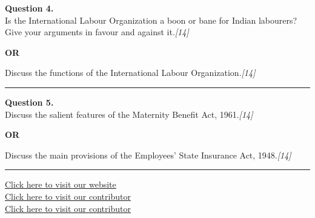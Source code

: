 \documentclass[11pt,a4paper]{article}
\newcommand{\pts}[1]{\hfill   \textit{[#1]}}
\begin{document}
\noindent   \textbf{Question 4.} \\
Is the International Labour Organization a boon or bane for Indian labourers? Give your arguments in favour and against it.\pts{14}

\centerline{   \textbf{OR}}

Discuss the functions of the International Labour Organization.\pts{14}

\medskip\rule{\linewidth}{0.2pt}




\noindent   \textbf{Question 5.} \\
Discuss the salient features of the Maternity Benefit Act, 1961.\pts{14}

\centerline{   \textbf{OR}}

Discuss the main provisions of the Employees' State Insurance Act, 1948.\pts{14}

\vfill
\rule{\linewidth}{0.4pt}

\begin{center}\small
\href{https://bhu-exam.vercel.app/}{Click here to visit our website}\\[4pt]
\href{https://me-aryan.vercel.app/}{Click here to visit our contributor}\\[4pt]
\href{https://quashan-me.vercel.app/}{Click here to visit our contributor}
\end{center}
\end{document}
